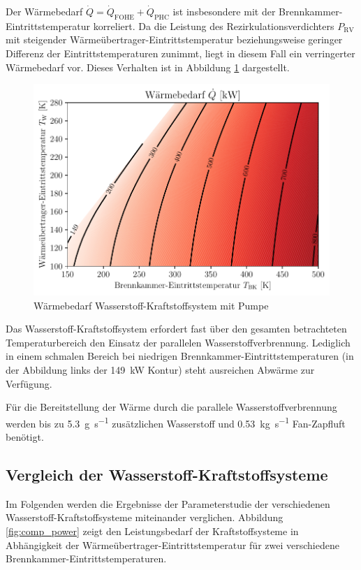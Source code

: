 Der Wärmebedarf $\dot{Q}=\dot{Q}_\mathrm{FOHE}+\dot{Q}_\mathrm{PHC}$ ist insbesondere mit der Brennkammer-Eintrittstemperatur korreliert. Da die Leistung des Rezirkulationsverdichters $P_\mathrm{RV}$ mit steigender Wärmeübertrager-Eintrittstemperatur beziehungsweise geringer Differenz der Eintrittstemperaturen zunimmt, liegt in diesem Fall ein verringerter Wärmebedarf vor. Dieses Verhalten ist in Abbildung \ref{fig:pumpheat} dargestellt.

\begin{figure}[ht]
\centering
\includegraphics[width=1\linewidth]{4_Abbildungen/2_Hauptteil/Ergebnisse/Pumpeheatcontour.pdf}
  \caption{Wärmebedarf Wasserstoff-Kraftstoffsystem mit Pumpe}
  \label{fig:pumpheat}
\end{figure}
\FloatBarrier

Das Wasserstoff-Kraftstoffsystem erfordert fast über den gesamten betrachteten Temperaturbereich den Einsatz der parallelen Wasserstoffverbrennung. Lediglich in einem schmalen Bereich bei niedrigen Brennkammer-Eintrittstemperaturen (in der Abbildung links der \SI{149}{\kilo\W} Kontur) steht ausreichen Abwärme zur Verfügung.

Für die Bereitstellung der Wärme durch die parallele Wasserstoffverbrennung werden bis zu \SI{5.3}{\g\per\s} zusätzlichen Wasserstoff und \SI{0.53}{\kg\per\s} Fan-Zapfluft benötigt.


\subsection{Vergleich der Wasserstoff-Kraftstoffsysteme}

Im Folgenden werden die Ergebnisse der Parameterstudie der verschiedenen Wasserstoff-Kraftstoffsysteme miteinander verglichen. Abbildung \ref{fig:comp_power} zeigt den Leistungsbedarf der Kraftstoffsysteme in Abhängigkeit der Wärmeübertrager-Eintrittstemperatur für zwei verschiedene Brennkammer-Eintrittstemperaturen.

